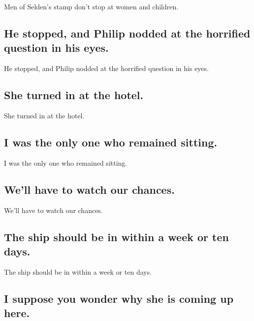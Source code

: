 \documentclass[]{article}
\begin{document}
Men of Selden's stamp don't stop at women and children.

\hypertarget{he-stopped-and-philip-nodded-at-the-horrified-question-in-his-eyes.}{%
\subsection{He stopped, and Philip nodded at the horrified question in
his
eyes.}\label{he-stopped-and-philip-nodded-at-the-horrified-question-in-his-eyes.}}

He stopped, and Philip nodded at the horrified question in his eyes.

\hypertarget{she-turned-in-at-the-hotel.}{%
\subsection{She turned in at the
hotel.}\label{she-turned-in-at-the-hotel.}}

She turned in at the hotel.

\hypertarget{i-was-the-only-one-who-remained-sitting.}{%
\subsection{I was the only one who remained
sitting.}\label{i-was-the-only-one-who-remained-sitting.}}

I was the only one who remained sitting.

\hypertarget{well-have-to-watch-our-chances.}{%
\subsection{We'll have to watch our
chances.}\label{well-have-to-watch-our-chances.}}

We'll have to watch our chances.

\hypertarget{the-ship-should-be-in-within-a-week-or-ten-days.}{%
\subsection{The ship should be in within a week or ten
days.}\label{the-ship-should-be-in-within-a-week-or-ten-days.}}

The ship should be in within a week or ten days.

\hypertarget{i-suppose-you-wonder-why-she-is-coming-up-here.}{%
\subsection{I suppose you wonder why she is coming up
here.}\label{i-suppose-you-wonder-why-she-is-coming-up-here.}}
\end{document}
